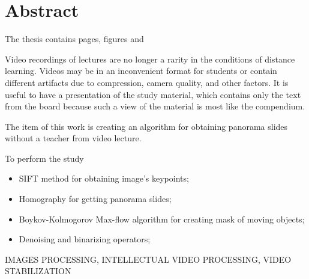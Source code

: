 \chapter*{Abstract}

The thesis contains 
pages,
figures
and 

Video recordings of lectures are no longer a rarity in 
the conditions of distance learning. 
Videos may be in an inconvenient format for 
students or contain different artifacts due 
to compression, camera quality, and other factors. 
It is useful to have a presentation of the study material, 
which contains only the text from the board 
because such a view of the material is most 
like the compendium. 

The item of this work 
is creating an algorithm for obtaining panorama 
slides without a teacher from video lecture.

To perform the study
\begin{itemize}
  \item
    SIFT method for obtaining image's keypoints;
  \item 
    Homography for getting panorama slides;
  \item 
    Boykov-Kolmogorov Max-flow algorithm for creating mask of
    moving objects;
  \item
    Denoising and binarizing operators;
\end{itemize}

\MakeUppercase{images processing, intellectual video 
processing, 
video stabilization}
